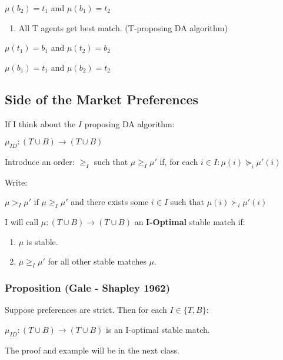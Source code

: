 \documentclass[11pt]{article}
\providecommand{\tightlist}{%
      \setlength{\itemsep}{0pt}\setlength{\parskip}{0pt}}
\begin{document}
\(\mu(b_2) = t_1\) and \(\mu(b_1) = t_2\)

\begin{enumerate}
\def\labelenumi{(\arabic{enumi})}
\setcounter{enumi}{1}
\tightlist
\item
  All T agents get best match. (T-proposing DA algorithm)
\end{enumerate}

\(\mu(t_1) = b_1\) and \(\mu(t_2) = b_2\)

\(\mu(b_1) = t_1\) and \(\mu(b_2) = t_2\)

    \subsection{Side of the Market
Preferences}\label{side-of-the-market-preferences}

If I think about the \(I\) proposing DA algorithm:

\(\mu_{ID}: (T \cup B) \rightarrow (T \cup B)\)

Introduce an order: \(\ge_I\) such that \(\mu \ge_I \mu'\) if, for each
\(i \in I: \mu(i) \succeq_i \mu'(i)\)

Write:

\(\mu >_I \mu'\) if \(\mu \ge_I \mu'\) and there exists some \(i \in I\)
such that \(\mu(i) \succ_i \mu'(i)\)

I will call \(\mu:(T \cup B) \rightarrow (T \cup B)\) an
\textbf{I-Optimal} stable match if:

\begin{enumerate}
\def\labelenumi{\arabic{enumi}.}
\tightlist
\item
  \(\mu\) is stable.
\item
  \(\mu \ge_I \mu'\) for all other stable matches \(\mu\).
\end{enumerate}

    \subsubsection{Proposition (Gale - Shapley
1962)}\label{proposition-gale---shapley-1962}

Suppose preferences are strict. Then for each \(I \in \{T, B\}\):

\(\mu_{ID}: (T \cup B) \rightarrow (T \cup B)\) is an I-optimal stable
match.

The proof and example will be in the next class.


    
    
    
    
\end{document}
